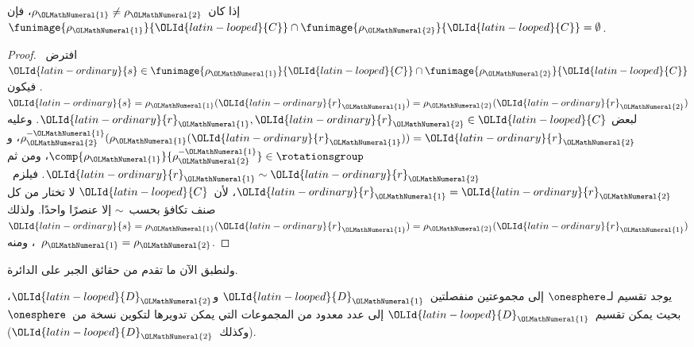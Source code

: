 \documentclass[../../../include/open-logic-section]{subfiles}
\begin{document}
\begin{lem}
إذا كان~$\rho_\OLMathNumeral{1} \neq \rho_\OLMathNumeral{2}$، فإن
$\funimage{\rho_\OLMathNumeral{1}}{\OLId{latin-looped}{C}} \cap \funimage{\rho_\OLMathNumeral{2}}{\OLId{latin-looped}{C}} = \emptyset$.
\end{lem}

\begin{proof}
افترض~$\OLId{latin-ordinary}{s} \in \funimage{\rho_{\OLMathNumeral{1}}}{\OLId{latin-looped}{C}} \cap
\funimage{\rho_{\OLMathNumeral{2}}}{\OLId{latin-looped}{C}}$. فيكون
$\OLId{latin-ordinary}{s} = \rho_{\OLMathNumeral{1}}(\OLId{latin-ordinary}{r}_{\OLMathNumeral{1}}) = \rho_{\OLMathNumeral{2}}(\OLId{latin-ordinary}{r}_{\OLMathNumeral{2}})$ لبعض
$\OLId{latin-ordinary}{r}_{\OLMathNumeral{1}}, \OLId{latin-ordinary}{r}_{\OLMathNumeral{2}} \in \OLId{latin-looped}{C}$. وعليه
$\rho^{-\OLMathNumeral{1}}_\OLMathNumeral{2}(\rho_\OLMathNumeral{1}(\OLId{latin-ordinary}{r}_\OLMathNumeral{1})) = \OLId{latin-ordinary}{r}_\OLMathNumeral{2}$، و
$\comp{\rho_\OLMathNumeral{1}}{\rho^{-\OLMathNumeral{1}}_\OLMathNumeral{2}} \in \rotationsgroup$، ومن ثم
$\OLId{latin-ordinary}{r}_{\OLMathNumeral{1}} \sim \OLId{latin-ordinary}{r}_{\OLMathNumeral{2}}$. فيلزم~$\OLId{latin-ordinary}{r}_\OLMathNumeral{1} = \OLId{latin-ordinary}{r}_\OLMathNumeral{2}$، لأن~$\OLId{latin-looped}{C}$ لا تختار من كل صنف
تكافؤ بحسب~$\sim$ إلا عنصرًا واحدًا. ولذلك
$\OLId{latin-ordinary}{s} = \rho_\OLMathNumeral{1}(\OLId{latin-ordinary}{r}_\OLMathNumeral{1}) = \rho_\OLMathNumeral{2}(\OLId{latin-ordinary}{r}_\OLMathNumeral{1})$، ومنه~$\rho_\OLMathNumeral{1} = \rho_\OLMathNumeral{2}$.
\end{proof}

ولنطبق الآن ما تقدم من حقائق الجبر على الدائرة.

\begin{lem}
يوجد تقسيم لـ$\onesphere$ إلى مجموعتين منفصلتين~$\OLId{latin-looped}{D}_{\OLMathNumeral{1}}$ و$\OLId{latin-looped}{D}_{\OLMathNumeral{2}}$،
بحيث يمكن تقسيم~$\OLId{latin-looped}{D}_{\OLMathNumeral{1}}$ إلى عدد معدود من المجموعات التي يمكن تدويرها
لتكوين نسخة من~$\onesphere$ (وكذلك~$\OLId{latin-looped}{D}_{\OLMathNumeral{2}}$).
\end{lem}
\end{document}
